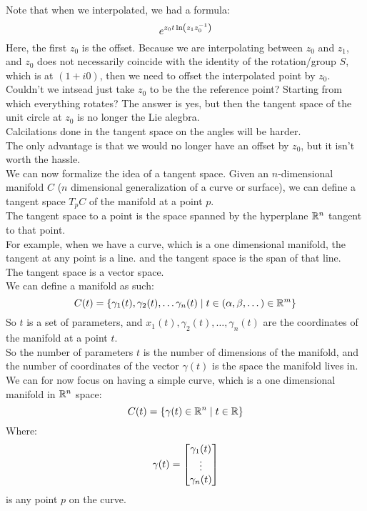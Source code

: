 \documentclass[12pt]{article}
\begin{document}
Note that when we interpolated,
we had a formula:
\[ e^{{z_0t\ln\left( z_1z_0^{-1} \right)}} \]
Here, the first $z_0$ is the offset.
Because we are interpolating between $z_0$
and $z_1$, and $z_0$
does not necessarily coincide with the
identity of the rotation/group $S$,
which is at $(1 + i0)$,
then we need to offset the interpolated point
by $z_0$. \\
Couldn't we intsead just take $z_0$ to
be the the reference point?
Starting from which everything rotates?
The answer is yes, but then the tangent
space of the unit circle at $z_0$
is no longer the Lie alegbra. \\
Calcilations done in the tangent space 
on the angles will be harder. \\
The only advantage is that we would no longer
have an offset by $z_0$,
but it isn't worth the hassle. \\

We can now formalize the idea of a tangent space.
Given an $n$-dimensional manifold $C$
($n$ dimensional
generalization of a curve or surface),
we can define a tangent space
$T_pC$ of the manifold at a point $p$. \\
The tangent space to a point is the space spanned
by the hyperplane $\mathbb{R}^{n}$
tangent to that point. \\
For example, when we have a curve,
which is a one dimensional manifold,
the tangent at any point is a line.
and the tangent space is the span
of that line. \\

The tangent space is a vector space. \\

We can define a manifold as such:
\[ C(t) = \{\gamma_1(t),\gamma_2(t), 
\dots\gamma_n(t) \mid
t \in (\alpha, \beta, \dots) \in \mathbb{R}^m \} \]
So $t$ is a set of parameters,
and $x_1(t),\gamma_2(t), \dots,\gamma_n(t)$
are the coordinates of the manifold at
a point $t$. \\

So the number of parameters $t$ is the number
of dimensions of the manifold,
and the number of coordinates of the
vector $\gamma(t)$ is the space
the manifold lives in. \\

We can for now focus on having a simple
curve, which is a one dimensional manifold
in $\mathbb{R}^n$ space:
\[ C(t) = \{\gamma(t) \in \mathbb{R}^n \mid t \in \mathbb{R} \} \]
Where:
\[ \gamma(t) = \begin{bmatrix} \gamma_1(t) \\ \vdots \\ \gamma_n(t) \end{bmatrix} \]
is any point $p$ on the curve. \\
\end{document}
